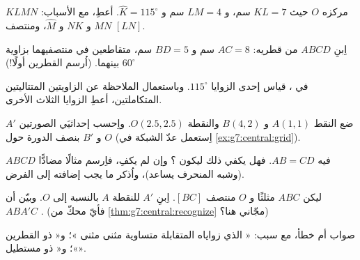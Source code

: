 \begin{exercise}[$\star$]\label{exo:g7:central:4}
$KLMN$  مركزه $O$ حيث $KL = 7$ سم،
و $LM = 4$ سم و $\widehat K = 115^\circ$. أعطِ، مع الأسباب: $MN$
و $NK$ و $\widehat M$، ومنتصف $[LN]$.
\end{exercise}

\begin{exercise}[$\star$]\label{exo:g7:central:5}
اِبنِ  $ABCD$ من قطريه: $AC = 8$ سم و
$BD = 5$ سم، متقاطعين في منتصفيهما بزاوية $60^\circ$
بينهما. (اُرسم القطرين أولًا!)
\end{exercise}

\begin{exercise}[$\star$]\label{exo:g7:central:6}
في ، قياس إحدى الزوايا $115^\circ$. وباستعمال الملاحظة
عن الزاويتين المتتاليتين المتكاملتين، أعطِ الزوايا الثلاث الأخرى.
\end{exercise}

\begin{exercise}[$\star\star$]\label{exo:g7:central:7}
ضع النقط $A(1, 1)$ و $B(4, 2)$ والنقطة $O(2.5, 2.5)$. واِحسب
إحداثيَي الصورتين $A'$ و $B'$ بنصف الدورة حول $O$
(اِستعمل عدّ الشبكة في \cref{ex:g7:central:grid}).
\end{exercise}

\begin{exercise}[$\star\star$]\label{exo:g7:central:8}
$ABCD$  فيه $AB = CD$. فهل يكفي ذلك ليكون
؟ وإن لم يكفِ، فاِرسم مثالًا مضادًّا (وشبه المنحرف
 يساعد)، واُذكر ما يجب إضافته إلى الفرض.
\end{exercise}

\begin{exercise}[$\star\star$]\label{exo:g7:central:9}
ليكن $ABC$ مثلثًا و $O$ منتصف $[BC]$. اِبنِ
 $A'$ للنقطة $A$ بالنسبة إلى $O$. وبيّن أن $ABA'C$
. (فأيّ محكّ من \cref{thm:g7:central:recognize}
مجّاني هنا؟)
\end{exercise}

\begin{exercise}[$\star\star$]\label{exo:g7:central:10}
صواب أم خطأ، مع سبب: « الذي زواياه المتقابلة
متساوية مثنى مثنى »؛ و« ذو
القطرين  »؛ و« ذو  مستطيل».
\end{exercise}

